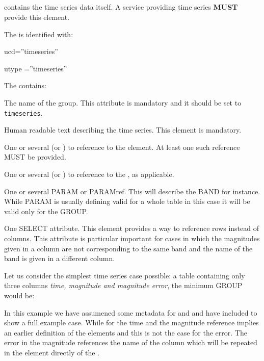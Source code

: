 \subsection{}
 contains the time series data itself. A service providing time series \textbf{MUST} provide this element.

The  is identified with:
\begin{description}
\item ucd=''timeseries'' 
\item utype =''timeseries'' 
\end{description}

The  contains:
\begin{description}
     \item[] The name of the group. This attribute is mandatory and it should be set to \verb|timeseries|. 
     \item[] Human readable text describing the time series. This element is mandatory. 
     \item[] One or several  (or ) to reference to the  element. At least one such reference MUST be provided.
     \item[] One or several  (or ) to reference to the ,  as applicable. 
     \item One or several PARAM or PARAMref. This will describe the BAND for instance. While PARAM is usually defining valid for a whole table in this case it will be valid only for the GROUP.  
     \item[\elem{SELECT}] One SELECT attribute. This element provides a way to reference rows instead of columns. This attribute is particular important for cases in which the magnitudes given in a column are not corresponding to the same band and the name of the band is given in a different column. 
\end{description}

Let us consider the simplest time series case possible: a table containing only three columns \emph{time, magnitude and magnitude error}, the minimum GROUP would be:

\begingroup

\endgroup

In this example we have assumened some metadata for  and  and have included to show a full example case. While for the time and the magnitude reference implies an earlier definition of the elements  and  this is not the case for the error. The error in the magnitude references the name of the column which will be repeated in the  element directly of the .

